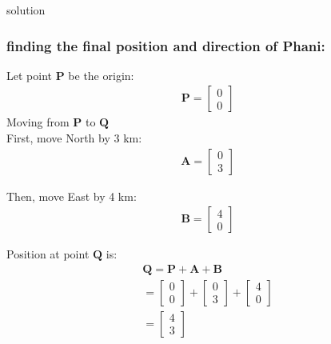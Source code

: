 \documentclass{beamer}
\begin{document}
\begin{frame}{solution}
    \frametitle{finding the final position and direction of Phani:}
Let point $\mathbf{P}$  be the origin:
\begin{align}
\mathbf{P} = \begin{bmatrix} 0 \\ 0 \end{bmatrix}
\end{align}
Moving from  $\mathbf{P}$ to $\mathbf{Q}$\\
First, move North by 3 km:
\begin{align}
\mathbf{A} = \begin{bmatrix} 0 \\ 3 \end{bmatrix}
\end{align}
\end{frame}
\begin{frame}
Then, move East by 4 km:
\begin{align}
\mathbf{B} = \begin{bmatrix} 4 \\ 0 \end{bmatrix}
\end{align}

Position at point  $\mathbf{Q}$ is:
\begin{align}
\mathbf{Q} = \mathbf{P} + \mathbf{A} + \mathbf{B} \\= \begin{bmatrix} 0 \\ 0 \end{bmatrix} + \begin{bmatrix} 0 \\ 3 \end{bmatrix} + \begin{bmatrix} 4 \\ 0 \end{bmatrix} \\= \begin{bmatrix} 4 \\ 3 \end{bmatrix}
\end{align}
\end{frame}
\end{document}
